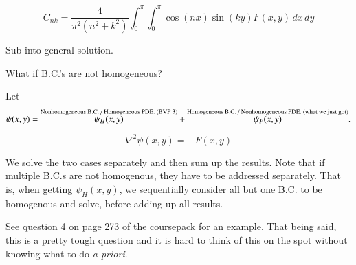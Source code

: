 \documentclass{report}
\begin{document}
$$
\boxed{C_{nk}=\dfrac{4}{\pi^{2}\left(n^{2}+k^{2}\right)} \int_{0}^{\pi}\int_{0}^{\pi}\cos(nx)\sin(ky)F(x,y)\,dx\,dy}
$$


Sub into general solution.

What if B.C.'s are not homogeneous?

Let
\[
\psi(x,y)=\overset{\scriptsize \text{Nonhomogeneous B.C. / Homogeneous PDE. (BVP 3)}}{\psi_H(x,y)}
+\overset{\scriptsize \text{Homogeneous B.C. / Nonhomogeneous PDE. (what we just got)}}{\psi_P(x,y)}.
\]

$$
\nabla^{2} \psi(x, y)=-F(x, y)
$$

We solve the two cases separately and then sum up the results. Note that if multiple B.C.s are not homogenous, they have to be addressed separately. That is, when getting $\psi_{H}(x,y)$, we sequentially consider all but one B.C. to be homogenous and solve, before adding up all results.

See question 4 on page 273 of the coursepack for an example. That being said, this is a pretty tough question and it is hard to think of this on the spot without knowing what to do \emph{a priori}.
\end{document}
